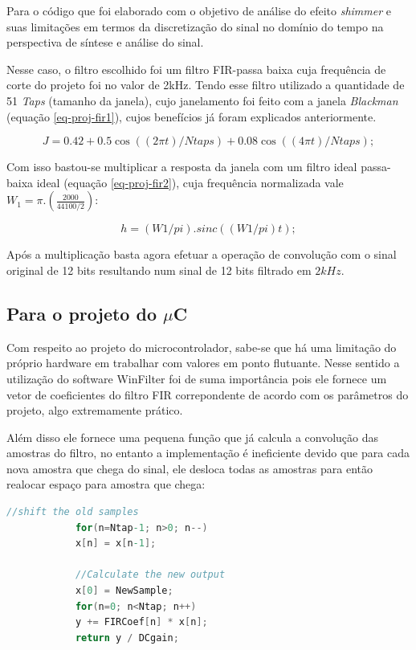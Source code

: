 		Para o código que foi elaborado com o objetivo de análise do efeito \textit{shimmer} e suas limitações em termos da discretização do sinal no domínio do tempo na perspectiva de síntese e análise do sinal.
		
		Nesse caso, o filtro escolhido foi um filtro FIR-passa baixa cuja frequência de corte do projeto foi no valor de 2kHz. Tendo esse filtro utilizado a quantidade de 51 \textit{Taps} (tamanho da janela), cujo janelamento foi feito com a janela \textit{Blackman} (equação \ref{eq-proj-fir1}), cujos benefícios já foram explicados anteriormente.
		
		\begin{equation}
			J = 0.42 + 0.5\cos((2\pi t)/Ntaps) + 0.08\cos((4\pi t)/Ntaps);
			\label{eq-proj-fir1}
		\end{equation}
		
		Com isso bastou-se multiplicar a resposta da janela com um filtro ideal passa-baixa ideal (equação \ref{eq-proj-fir2}), cuja frequência normalizada vale $W_1 = \pi.\left(\frac{2000}{44100/2}\right)$:
		
		\begin{equation}
			h= (W1/pi).sinc((W1/pi)t);
			\label{eq-proj-fir2}
		\end{equation}
		
		Após a multiplicação basta agora efetuar a operação de convolução com o sinal original de 12 bits resultando num sinal de 12 bits filtrado em $ 2kHz $.
	
	\subsection{Para o projeto do $ \mu $C}
		
		Com respeito ao projeto do microcontrolador, sabe-se que há uma limitação do próprio hardware em trabalhar com valores em ponto flutuante. Nesse sentido a utilização do software WinFilter foi de suma importância pois ele fornece um vetor de coeficientes do filtro FIR correpondente de acordo com os parâmetros do projeto, algo extremamente prático.
		
		Além disso ele fornece uma pequena função que já calcula a convolução das amostras do filtro, no entanto a implementação é ineficiente devido que para cada nova amostra que chega do sinal, ele desloca todas as amostras para então realocar espaço para amostra que chega:
		
		\begin{lstlisting}[caption={Código Gerado no WinFilter para um filtro FIR},label={lst:cod-winfilter01},language=C]
			//shift the old samples
			for(n=Ntap-1; n>0; n--)
			x[n] = x[n-1];
			
			//Calculate the new output
			x[0] = NewSample;
			for(n=0; n<Ntap; n++)
			y += FIRCoef[n] * x[n];
			return y / DCgain;
		\end{lstlisting}
		

